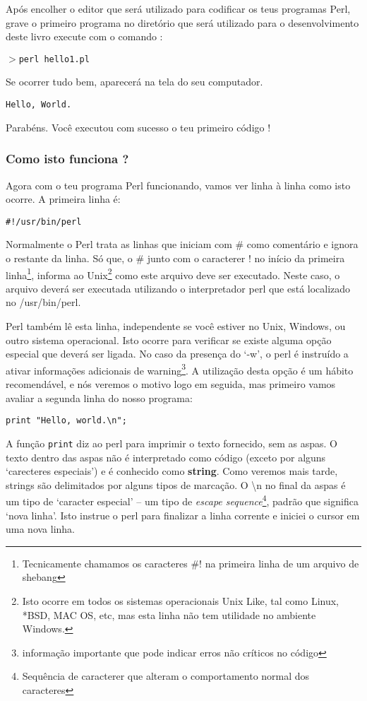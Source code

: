 \documentclass[a4paper,12pt,twoside]{book}
\begin{document}
\noindent Após encolher o editor que será utilizado para codificar os teus programas Perl, 
grave o primeiro programa no diretório que será utilizado para o desenvolvimento deste 
livro execute com o comando :\medskip

\noindent $>$\texttt{perl hello1.pl}\medskip

\noindent Se ocorrer tudo bem, aparecerá na tela do seu computador.\medskip

\noindent \texttt{Hello, World.}\medskip

\noindent Parabéns. Você executou com sucesso o teu primeiro código !

\subsubsection{Como isto funciona ?}
\noindent Agora com o teu programa Perl funcionando, vamos ver linha à 
linha como isto ocorre. A primeira linha é:\medskip

\noindent \texttt{\#!/usr/bin/perl}

\noindent Normalmente o Perl trata as linhas que iniciam com \# como
comentário e ignora o restante da linha. S\'o que, o \# junto com o caracterer ! 
no início da primeira linha\footnote{Tecnicamente chamamos os caracteres \#! na primeira linha de um arquivo de shebang}, informa ao Unix\footnote{Isto ocorre em todos os 
sistemas operacionais Unix Like, tal como Linux, *BSD, MAC OS, etc, mas esta 
linha não tem utilidade no ambiente Windows.} como este arquivo deve ser 
executado. Neste caso, o arquivo deverá ser executada utilizando o interpretador 
perl que está localizado no /usr/bin/perl.\medskip

\noindent Perl também lê esta linha, independente se você estiver no Unix, 
Windows, ou outro sistema operacional. Isto ocorre para verificar se existe 
alguma opção especial que deverá ser ligada. No caso da presença do `-w', 
o perl é instruído a ativar informações adicionais de warning\footnote{informação 
importante que pode indicar erros não críticos no código}. A utilização desta 
opção é um hábito recomendável, e nós veremos o motivo logo em seguida, mas 
primeiro vamos avaliar a segunda linha do nosso programa:\medskip

\noindent \texttt{print "Hello, world.\textbackslash n";}\medskip

\noindent A função \texttt{print} diz ao perl para imprimir o texto fornecido, sem as
aspas. O texto dentro das aspas não é interpretado como código (exceto por
alguns `carecteres especiais') e é conhecido como \textbf{string}.
Como veremos mais tarde, strings são delimitados por alguns tipos de marcação.
O \textbackslash n no final da aspas é um tipo de `caracter especial' -- um 
tipo de \textit{escape sequence}\footnote{Sequência de caracterer que alteram 
o comportamento normal dos caracteres}, padrão que significa `nova linha'. Isto 
instrue o perl para finalizar a linha corrente e iniciei o cursor em uma nova linha.\medskip
\end{document}
